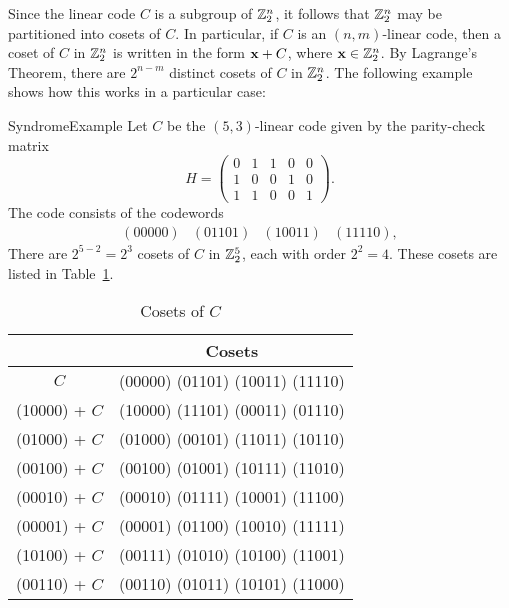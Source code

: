 Since the
linear code $C$ is a subgroup of ${\Bbb Z}_2^n$, it follows that ${\Bbb Z}_2^n$ 
may be partitioned into cosets of $C$. 
In particular,  if $C$ is an $(n,m)$-linear code, then a coset of $C$ in ${\Bbb Z}_2^n$ is written in
the form ${\bold x} + C$, where ${\bold x} \in {\Bbb Z}_2^n$. By Lagrange's Theorem, 
there are $2^{n-m}$ distinct cosets of $C$ in ${\Bbb Z}_2^n$. The following example shows how 
this works in a particular case:

 
\begin{example}{SyndromeExample}
Let $C$ be the $(5,3)$-linear code given by the parity-check matrix
\[
H =
\left(
\begin{array}{cccccc}
0 & 1 & 1 & 0 & 0 \\
1 & 0 & 0 & 1 & 0 \\
1 & 1 & 0 & 0 & 1
\end{array}
\right).
\]
The code consists of the codewords
\[
\begin{array}{cccc}
(00000)& (01101)& (10011)& (11110),
\end{array}
\]
There are $2^{5-2} = 2^3$ cosets of $C$ in ${\Bbb Z}_2^5$, each with
order $2^2 =4$.  These cosets are listed in Table~\ref{table:algcodes:cosets}. 
\end{example}
 
 
\begin{table}
\caption{Cosets of $C$\label{table:algcodes:cosets}}{\small
\begin{center}
\begin{tabular}{|c|c|}
\hline
 & Cosets \\
\hline
          $C$ & (00000)  (01101)  (10011)  (11110) \\
(10000) + $C$ & (10000)  (11101)  (00011)  (01110) \\
(01000) + $C$ & (01000)  (00101)  (11011)  (10110) \\
(00100) + $C$ & (00100)  (01001)  (10111)  (11010) \\
(00010) + $C$ & (00010)  (01111)  (10001)  (11100) \\
(00001) + $C$ & (00001)  (01100)  (10010)  (11111) \\
(10100) + $C$ & (00111)  (01010)  (10100)  (11001) \\
(00110) + $C$ & (00110)  (01011)  (10101)  (11000) \\
\hline
\end{tabular}
\end{center}
}
\end{table}
 
